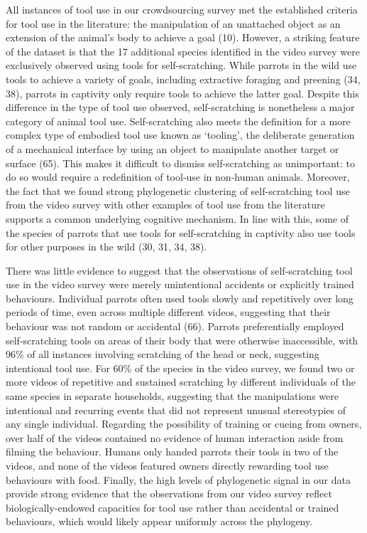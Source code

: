 \documentclass[
  man, donotrepeattitle,floatsintext]{apa6}
\begin{document}
All instances of tool use in our crowdsourcing survey met the established
criteria for tool use in the literature: the manipulation of an unattached
object as an extension of the animal's body to achieve a goal (10).
However, a striking feature of the dataset is that the 17 additional species
identified in the video survey were exclusively observed using tools for
self-scratching. While parrots in the wild use tools to achieve a variety of
goals, including extractive foraging and preening (34, 38),
parrots in captivity only require tools to achieve the latter goal. Despite this
difference in the type of tool use observed, self-scratching is nonetheless a
major category of animal tool use. Self-scratching also meets the definition for
a more complex type of embodied tool use known as `tooling', the deliberate
generation of a mechanical interface by using an object to manipulate another
target or surface (65). This makes it difficult to dismiss
self-scratching as unimportant: to do so would require a redefinition of
tool-use in non-human animals. Moreover, the fact that we found strong
phylogenetic clustering of self-scratching tool use from the video survey with
other examples of tool use from the literature supports a common underlying
cognitive mechanism. In line with this, some of the species of parrots that use
tools for self-scratching in captivity also use tools for other purposes in the
wild (30, 31, 34, 38).

There was little evidence to suggest that the observations of self-scratching
tool use in the video survey were merely unintentional accidents or explicitly
trained behaviours. Individual parrots often used tools slowly and repetitively
over long periods of time, even across multiple different videos, suggesting
that their behaviour was not random or accidental (66). Parrots
preferentially employed self-scratching tools on areas of their body that were
otherwise inaccessible, with 96\% of all instances involving scratching of the
head or neck, suggesting intentional tool use. For 60\% of the species in the
video survey, we found two or more videos of repetitive and sustained scratching
by different individuals of the same species in separate households, suggesting
that the manipulations were intentional and recurring events that did not
represent unusual stereotypies of any single individual. Regarding the
possibility of training or cueing from owners, over half of the videos contained
no evidence of human interaction aside from filming the behaviour. Humans only
handed parrots their tools in two of the videos, and none of the videos featured
owners directly rewarding tool use behaviours with food. Finally, the high
levels of phylogenetic signal in our data provide strong evidence that the
observations from our video survey reflect biologically-endowed capacities for
tool use rather than accidental or trained behaviours, which would likely appear
uniformly across the phylogeny.
\end{document}
